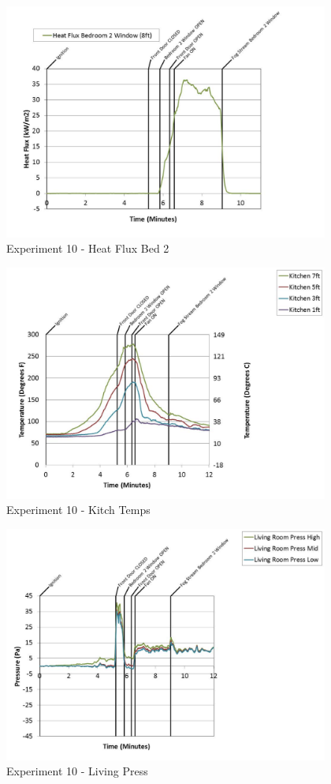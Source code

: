 \documentclass{article}
\begin{document}
\begin{appendices}
	\begin{figure}[h!]
		\centering
		\includegraphics[height=3.05in]{0_Images/Results_Charts/Exp_10_Charts/HeatFluxBed2.pdf}
		\caption{Experiment 10 - Heat Flux Bed 2}
	\end{figure}
 
	\clearpage

	\begin{figure}[h!]
		\centering
		\includegraphics[height=3.05in]{0_Images/Results_Charts/Exp_10_Charts/KitchTemps.pdf}
		\caption{Experiment 10 - Kitch Temps}
	\end{figure}
 

	\begin{figure}[h!]
		\centering
		\includegraphics[height=3.05in]{0_Images/Results_Charts/Exp_10_Charts/LivingPress.pdf}
		\caption{Experiment 10 - Living Press}
	\end{figure}
 

\end{appendices}
\end{document}
